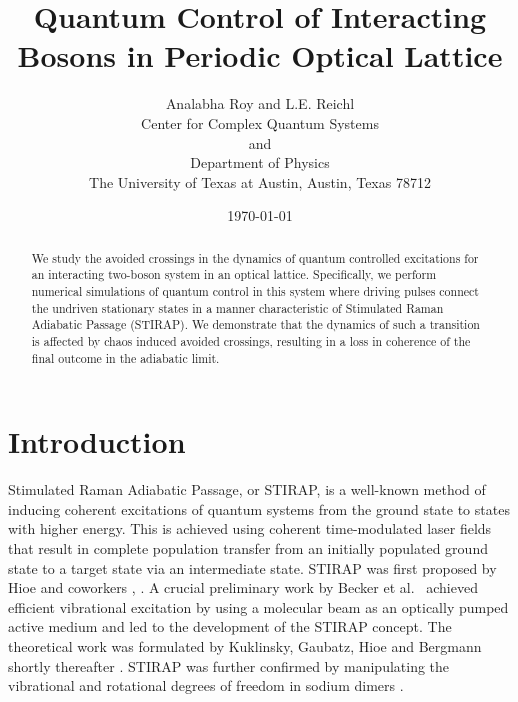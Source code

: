 \documentclass{article}
\begin{document}
\title{Quantum Control  of Interacting Bosons in Periodic Optical Lattice}
\author{Analabha Roy and L.E. Reichl \\
Center for Complex Quantum Systems\\
and\\
Department of Physics\\
The University of Texas at Austin, Austin, Texas 78712\\}
\date{\today }
\maketitle

%
\begin{abstract}

We study the avoided crossings in the dynamics of quantum controlled excitations for an interacting two-boson system in an optical lattice.  Specifically, we perform numerical simulations of quantum control in this system where  driving pulses connect the undriven stationary states in a manner characteristic of Stimulated Raman Adiabatic Passage (STIRAP). We demonstrate that the dynamics of such a transition is affected by chaos induced avoided crossings, resulting in a loss in coherence  of the final outcome in the adiabatic limit.

\end{abstract}
%

%
\section{Introduction}
\label{sec:intro}
%

Stimulated Raman Adiabatic Passage, or STIRAP,  is a well-known method of inducing coherent excitations of quantum systems from the ground state to states with higher energy. This is achieved using coherent time-modulated laser fields that result in complete population transfer from an initially populated ground state to a target state via an intermediate state.  STIRAP was first proposed by Hioe and coworkers \cite{stirap:hioe}, \cite{hioe:rwa:stirap}.  A crucial preliminary work by Becker  et al.~\cite{stirap:seminal} achieved efficient vibrational excitation by using a molecular beam as an optically pumped active medium and led to the development of the STIRAP concept. The theoretical work was formulated by Kuklinsky, Gaubatz, Hioe and Bergmann shortly thereafter \cite{stirap:theory}. STIRAP was further confirmed by manipulating the vibrational and rotational degrees of freedom in sodium dimers \cite{stirap:experiment}. 
\end{document}
